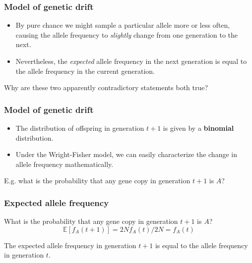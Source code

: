 \documentclass{beamer}
\newcommand{\E}{\mathbb{E}}
\newcommand{\1}{\ensuremath{\mathbf{1}}}
\begin{document}
%
%
%
\begin{frame}\frametitle{Model of genetic drift}
	\begin{itemize}
		\item By pure chance we might sample a particular allele more or less often, causing the allele frequency to \emph{slightly} change from one generation to the next.
		\item Nevertheless, the \emph{expected} allele frequency in the next generation is equal to the allele frequency in the current generation.
	\end{itemize}
	\vspace{2ex}Why are these two apparently contradictory statements both true?
\end{frame}
%
%
%
\begin{frame}\frametitle{Model of genetic drift}
	\begin{itemize}
		\item The distribution of offspring in generation $t + 1$ is given by a \textbf{binomial} distribution.
		\item Under the Wright-Fisher model, we can easily characterize the change in allele frequency mathematically.
	\end{itemize}
	\vspace{2ex}E.g. what is the probability that any gene copy in generation $t + 1$ is $A$?
\end{frame}
%
%
%
\begin{frame}\frametitle{Expected allele frequency}
	What is the probability that any gene copy in generation $t + 1$ is $A$?
	\begin{equation}
		\E[f_A(t+1)] = 2N f_A(t)/2N = f_A(t)
	\end{equation}
	\begin{block}{}
		The expected allele frequency in generation $t + 1$ is equal to the allele frequency in generation $t$.
	\end{block}
\end{frame}
\end{document}
